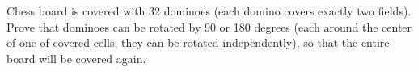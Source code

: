 \problem
Chess board is covered with 32 dominoes (each domino covers exactly two
fields).
Prove that dominoes can be rotated by 90 or 180 degrees (each around the center
of one of covered cells, they can be rotated independently), so that the entire
board will be covered again.
\solution
\endproblem
